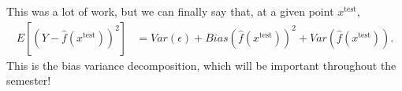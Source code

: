 \documentclass[titlepage,10pt]{scrartcl}
\newcommand{\xte}{x^{\mathrm{test}}}
\begin{document}
This was a lot of work, but we can finally say that, at a given point $\xte$,  
\begin{align*}
 E\left[\left(Y - \hat{f}(\xte)\right)^2 \right] &= Var(\epsilon) + Bias(\hat{f}(\xte))^2 + Var(\hat{f}(\xte)). 
\end{align*}
This is the bias variance decomposition, which will be important throughout the semester! 

\end{document}
